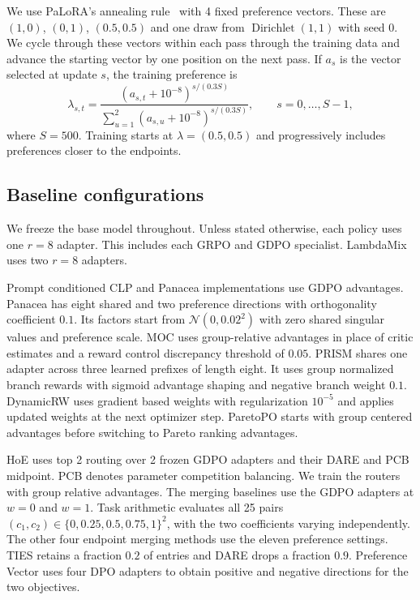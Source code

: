 \documentclass{article} %
\begin{document}
We use PaLoRA's annealing rule~\citep{dimitriadis2025palora} with 4 fixed preference vectors. These are $(1,0)$, $(0,1)$, $(0.5,0.5)$ and one draw from $\operatorname{Dirichlet}(1,1)$ with seed 0. We cycle through these vectors within each pass through the training data and advance the starting vector by one position on the next pass. If $a_s$ is the vector selected at update $s$, the training preference is
\begin{equation}
\lambda_{s,t}=\frac{(a_{s,t}+10^{-8})^{s/(0.3S)}}{\sum_{u=1}^{2}(a_{s,u}+10^{-8})^{s/(0.3S)}},
\qquad s=0,\ldots,S-1,
\end{equation}
where $S=500$. Training starts at $\lambda=(0.5,0.5)$ and progressively includes preferences closer to the endpoints.





\subsection{Baseline configurations}
\label{app:baseline-configurations}

We freeze the base model throughout. Unless stated otherwise, each policy uses one $r=8$ adapter. This includes each GRPO and GDPO specialist. LambdaMix uses two $r=8$ adapters. 

Prompt conditioned CLP and Panacea implementations use GDPO advantages. Panacea has eight shared and two preference directions with orthogonality coefficient $0.1$. Its factors start from $\mathcal{N}(0,0.02^2)$ with zero shared singular values and preference scale. MOC uses group-relative advantages in place of critic estimates and a reward control discrepancy threshold of $0.05$. PRISM shares one adapter across three learned prefixes of length eight. It uses group normalized branch rewards with sigmoid advantage shaping and negative branch weight $0.1$. DynamicRW uses gradient based weights with regularization $10^{-5}$ and applies updated weights at the next optimizer step. ParetoPO starts with group centered advantages before switching to Pareto ranking advantages.

HoE uses top 2 routing over 2 frozen GDPO adapters and their DARE and PCB midpoint. PCB denotes parameter competition balancing. We train the routers with group relative advantages. The merging baselines use the GDPO adapters at $w=0$ and $w=1$. Task arithmetic evaluates all 25 pairs $(c_1,c_2)\in\{0,0.25,0.5,0.75,1\}^{2}$, with the two coefficients varying independently. The other four endpoint merging methods use the eleven preference settings. TIES retains a fraction $0.2$ of entries and DARE drops a fraction $0.9$. Preference Vector uses four DPO adapters to obtain positive and negative directions for the two objectives.
\end{document}
